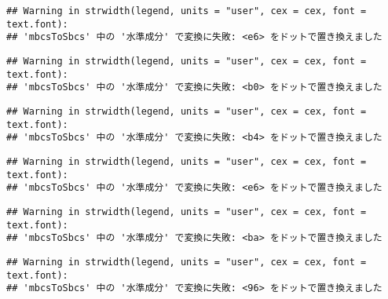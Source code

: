 \documentclass[]{article}
\newenvironment{Shaded}{\begin{snugshade}}{\end{snugshade}}
\newcommand{\AttributeTok}[1]{\textcolor[rgb]{0.77,0.63,0.00}{#1}}
\newcommand{\CommentTok}[1]{\textcolor[rgb]{0.56,0.35,0.01}{\textit{#1}}}
\newcommand{\DecValTok}[1]{\textcolor[rgb]{0.00,0.00,0.81}{#1}}
\newcommand{\FloatTok}[1]{\textcolor[rgb]{0.00,0.00,0.81}{#1}}
\newcommand{\FunctionTok}[1]{\textcolor[rgb]{0.00,0.00,0.00}{#1}}
\newcommand{\NormalTok}[1]{#1}
\newcommand{\SpecialCharTok}[1]{\textcolor[rgb]{0.00,0.00,0.00}{#1}}
\newcommand{\StringTok}[1]{\textcolor[rgb]{0.31,0.60,0.02}{#1}}
\begin{document}
\begin{Shaded}
\end{Shaded}

\begin{verbatim}
## Warning in strwidth(legend, units = "user", cex = cex, font = text.font):
## 'mbcsToSbcs' 中の '水準成分' で変換に失敗: <e6> をドットで置き換えました
\end{verbatim}

\begin{verbatim}
## Warning in strwidth(legend, units = "user", cex = cex, font = text.font):
## 'mbcsToSbcs' 中の '水準成分' で変換に失敗: <b0> をドットで置き換えました
\end{verbatim}

\begin{verbatim}
## Warning in strwidth(legend, units = "user", cex = cex, font = text.font):
## 'mbcsToSbcs' 中の '水準成分' で変換に失敗: <b4> をドットで置き換えました
\end{verbatim}

\begin{verbatim}
## Warning in strwidth(legend, units = "user", cex = cex, font = text.font):
## 'mbcsToSbcs' 中の '水準成分' で変換に失敗: <e6> をドットで置き換えました
\end{verbatim}

\begin{verbatim}
## Warning in strwidth(legend, units = "user", cex = cex, font = text.font):
## 'mbcsToSbcs' 中の '水準成分' で変換に失敗: <ba> をドットで置き換えました
\end{verbatim}

\begin{verbatim}
## Warning in strwidth(legend, units = "user", cex = cex, font = text.font):
## 'mbcsToSbcs' 中の '水準成分' で変換に失敗: <96> をドットで置き換えました
\end{verbatim}
\end{document}
